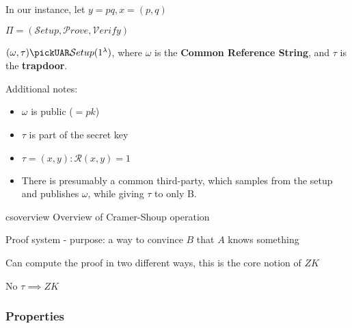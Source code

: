 In our instance, let $y = pq, x = (p,q)$

$\Pi = (\mathcal{S}etup, \mathcal{P}rove, \mathcal{V}erify)$

$(\omega, \tau) \pickUAR \mathcal{S}etup(1^\lambda)$, where $\omega$ is the \textbf{Common Reference String}, and $\tau$ is the \textbf{trapdoor}.

Additional notes:
\begin{itemize}
    \item $\omega$ is public ($ = pk$)
    \item $\tau$ is part of the secret key
    \item $\tau = (x, y) : \mathcal{R}(x, y) = 1$ %
    \item There is presumably a common third-party, which samples from the setup and publishes $\omega$, while giving $\tau$ to only B. %
\end{itemize}

\begin{cryptosequence}
    {csoverview}
    {Overview of Cramer-Shoup operation}
    

    \cseqdelay

    
\end{cryptosequence}

Proof system - purpose: a way to convince $B$ that $A$ knows something

Can compute the proof in two different ways, this is the core notion of $ZK$

No $\tau \implies ZK$

\subsubsection{Properties}

